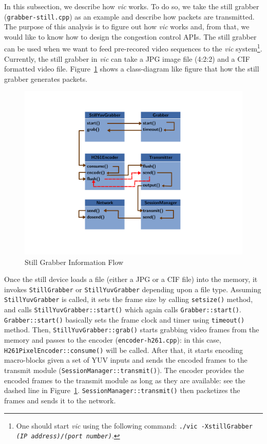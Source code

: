 In this subsection, we describe how \emph{vic} works. To do so, we take the
still grabber (\texttt{grabber-still.cpp}) as an example and describe how
packets are transmitted.  The purpose of this analysis is to figure out how
\emph{vic} works and, from that, we would like to know how to design the
congestion control APIs. The still grabber can be used when we want to feed
pre-recored video sequences to the \emph{vic} system\footnote{One should start
\emph{vic} using the following command: \texttt{./vic -XstillGrabber \emph{(IP
address)}/\emph{(port number)}}.}. Currently, the still grabber in \emph{vic}
can take a JPG image file (4:2:2) and a CIF formatted video file.
Figure~\ref{fig:still-grabber} shows a class-diagram like figure that how the
still grabber generates packets. \\

\begin{figure}[!h] 
\begin{center}
\includegraphics[scale=.5]{./img/still-grabber}
\caption{\label{fig:still-grabber}Still Grabber Information Flow}
\end{center} 
\end{figure}

Once the still device loads a file (either a JPG or a CIF file) into the memory,
it invokes \texttt{StillGrabber} or \texttt{StillYuvGrabber} depending upon a
file type. Assuming \texttt{StillYuvGrabber} is called, it sets the frame size
by calling \texttt{setsize()} method, and calls
\texttt{StillYuvGrabber::start()} which again calls \texttt{Grabber::start()}.
\texttt{Grabber::start()} basically sets the frame clock and timer using
\texttt{timeout()} method.  Then, \texttt{StillYuvGrabber::grab()} starts
grabbing video frames from the memory and passes to the encoder
(\texttt{encoder-h261.cpp}): in this case, \texttt{H261PixelEncoder::consume()}
will be called. After that, it starts encoding macro-blocks given a set of YUV
inputs and sends the encoded frames to the transmit module
(\texttt{SessionManager::transmit()}). The encoder provides the encoded frames
to the transmit module as long as they are available: see the dashed line in
Figure~\ref{fig:still-grabber}.  \texttt{SessionManager::transmit()} then
packetizes the frames and sends it to the network. \\

